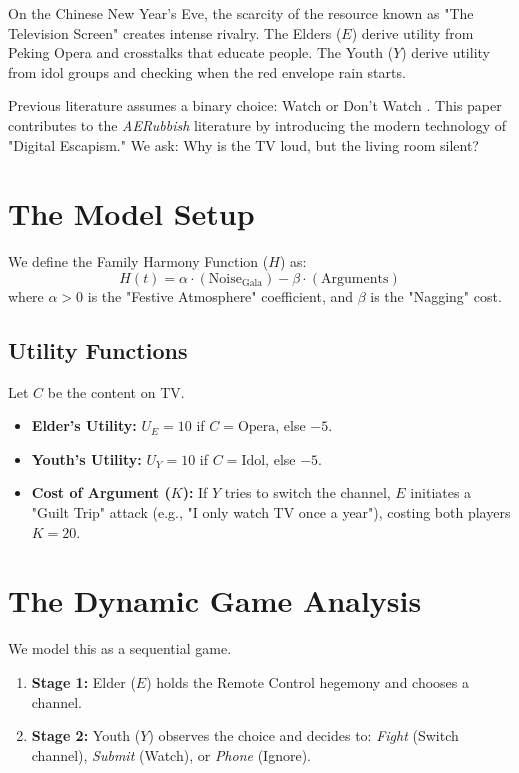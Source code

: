 \documentclass[AER]{AEA}
\begin{document}

On the Chinese New Year's Eve, the scarcity of the resource known as "The Television Screen" creates intense rivalry. 
The Elders ($E$) derive utility from Peking Opera and crosstalks that educate people. 
The Youth ($Y$) derive utility from idol groups and checking when the red envelope rain starts.

Previous literature assumes a binary choice: Watch or Don't Watch \citet{tv2000}. This paper contributes to the \textit{AERubbish} literature by introducing the modern technology of "Digital Escapism." We ask: Why is the TV loud, but the living room silent?

\section{The Model Setup}

We define the Family Harmony Function ($H$) as:
\begin{equation}
    H(t) = \alpha \cdot (\text{Noise}_{\text{Gala}}) - \beta \cdot (\text{Arguments})
\end{equation}
where $\alpha > 0$ is the "Festive Atmosphere" coefficient, and $\beta$ is the "Nagging" cost.

\subsection{Utility Functions}
Let $C$ be the content on TV.
\begin{itemize}
    \item \textbf{Elder's Utility:} $U_E = 10$ if $C = \text{Opera}$, else $-5$.
    \item \textbf{Youth's Utility:} $U_Y = 10$ if $C = \text{Idol}$, else $-5$.
    \item \textbf{Cost of Argument ($K$):} If $Y$ tries to switch the channel, $E$ initiates a "Guilt Trip" attack (e.g., "I only watch TV once a year"), costing both players $K=20$.
\end{itemize}

\section{The Dynamic Game Analysis}

We model this as a sequential game.
\begin{enumerate}
    \item \textbf{Stage 1:} Elder ($E$) holds the Remote Control hegemony and chooses a channel.
    \item \textbf{Stage 2:} Youth ($Y$) observes the choice and decides to: \textit{Fight} (Switch channel), \textit{Submit} (Watch), or \textit{Phone} (Ignore).
\end{enumerate}
\end{document}

